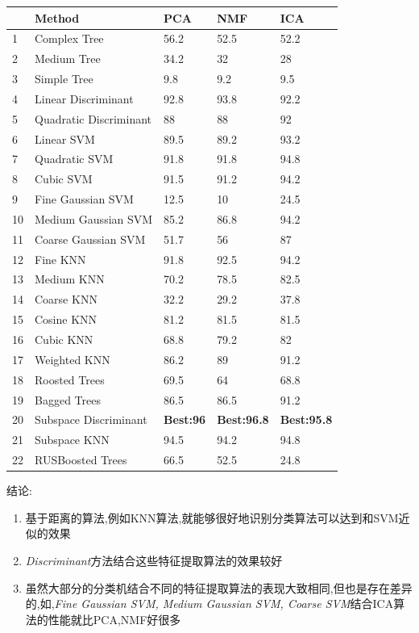 \begin{center}
\begin{tabular}{|l|l|l|l|l|}
\hline
&Method&PCA&NMF&ICA\\\hline
1&Complex Tree &56.2&52.5&52.2\\\hline
2&Medium Tree & 34.2&32&28\\\hline
3&Simple Tree & 9.8&9.2&9.5\\\hline
4&Linear Discriminant & 92.8&93.8&92.2\\\hline
5&Quadratic Discriminant & 88&88&92\\\hline
6&Linear SVM& 89.5&89.2&93.2\\\hline
7&Quadratic SVM&91.8&91.8&94.8\\\hline
8&Cubic SVM& 91.5&91.2&94.2\\\hline
9&Fine Gaussian SVM&12.5&10&24.5\\\hline
10&Medium Gaussian SVM&85.2&86.8&94.2\\\hline
11&Coarse Gaussian SVM&51.7&56&87\\\hline
12&Fine KNN&91.8&92.5&94.2\\\hline
13&Medium KNN&70.2&78.5&82.5\\\hline
14&Coarse KNN&32.2&29.2&37.8\\\hline
15&Cosine KNN&81.2&81.5&81.5\\\hline
16&Cubic KNN&68.8&79.2&82\\\hline
17&Weighted KNN&86.2&89&91.2\\\hline
18&Roosted Trees&69.5&64&68.8\\\hline
19&Bagged Trees&86.5&86.5&91.2\\\hline
20&Subspace Discriminant&\textbf{Best:96}&\textbf{Best:96.8}&\textbf{Best:95.8}\\\hline
21&Subspace KNN&94.5&94.2&94.8\\\hline
22&RUSBoosted Trees&66.5&52.5&24.8\\\hline
\end{tabular}
\end{center}
结论:
\begin{enumerate}
	\item 基于距离的算法,例如KNN算法,就能够很好地识别分类算法可以达到和SVM近似的效果
	\item \textit{Discriminant}方法结合这些特征提取算法的效果较好
	\item 虽然大部分的分类机结合不同的特征提取算法的表现大致相同,但也是存在差异的,如,\textit{Fine Gaussian SVM, Medium Gaussian SVM, Coarse SVM}结合ICA算法的性能就比PCA,NMF好很多
\end{enumerate}

	

	